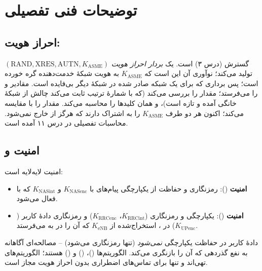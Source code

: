 \documentclass[11pt,a4paper]{article}
\begin{document}
\section{توضیحات فنی تفصیلی}

\subsection{احراز هویت: }
 \cite{ts33401} گسترش  (درس ۳) است.  یک \emph{بردار احراز هویت }
$(\text{RAND}, \text{XRES}, \text{AUTN}, K_{\mathrm{ASME}})$ تولید می‌کند؛ نوآوری آن این است که $K_{\mathrm{ASME}}$ به هویت
شبکهٔ خدمت‌دهنده گره خورده است؛ پس برداری که برای یک شبکه صادر شده در شبکهٔ دیگر بی‌فایده است.  مقادیر
 و  را می‌فرستد؛  مقدار  را بررسی می‌کند (که با شمارهٔ ترتیب  ثابت می‌کند
چالش از شبکهٔ خانگی آمده و تازه است)،  و همان کلیدها را محاسبه می‌کند.  مقدار  را با 
مقایسه می‌کند؛ اکنون هر دو طرف $K_{\mathrm{ASME}}$ را به اشتراک دارند که هرگز از  خارج نمی‌شود. محاسبات تفصیلی
 در درس ۱۱ آمده است.

\subsection{امنیت  و }
امنیت لایه‌لایه است:
\begin{itemize}
  \item \textbf{امنیت } (): رمزنگاری و حفاظت از یکپارچگی پیام‌های  با $K_{\mathrm{NASenc}}$ و
        $K_{\mathrm{NASint}}$ که با   فعال می‌شود.
  \item \textbf{امنیت } (): یکپارچگی و رمزنگاری  ($K_{\mathrm{RRCint}}$، $K_{\mathrm{RRCenc}}$) و
        رمزنگاری دادهٔ کاربر ($K_{\mathrm{UPenc}}$) در ، استخراج‌شده از $K_{\mathrm{eNB}}$ که  آن را در
         به  می‌فرستد.
\end{itemize}
دادهٔ کاربر در  حفاظت یکپارچگی \emph{نمی‌شود} (تنها رمزنگاری می‌شود) -- مصالحه‌ای آگاهانه به نفع گذردهی که
 آن را بازنگری می‌کند. الگوریتم‌ها  ()،  () و 
() هستند؛  الگوریتم‌های تهی‌اند و  تنها برای تماس‌های اضطراری بدون احراز هویت مجاز است.
\end{document}

